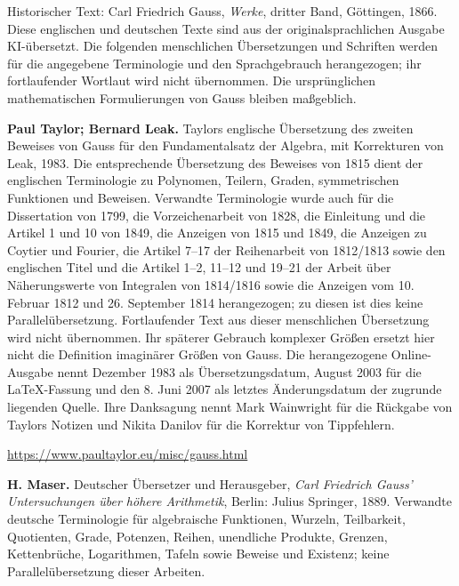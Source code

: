 \clearpage\thispagestyle{empty}\enlargethispage{3\baselineskip}\begingroup\small\raggedright
{}\medskip
Historischer Text: Carl Friedrich Gauss, \emph{Werke}, dritter Band, Göttingen, 1866. Diese englischen und deutschen Texte sind aus der originalsprachlichen Ausgabe KI-übersetzt. Die folgenden menschlichen Übersetzungen und Schriften werden für die angegebene Terminologie und den Sprachgebrauch herangezogen; ihr fortlaufender Wortlaut wird nicht übernommen. Die ursprünglichen mathematischen Formulierungen von Gauss bleiben maßgeblich.
\par\medskip\textbf{Paul Taylor; Bernard Leak.} Taylors englische Übersetzung des zweiten Beweises von Gauss für den Fundamentalsatz der Algebra, mit Korrekturen von Leak, 1983. Die entsprechende Übersetzung des Beweises von 1815 dient der englischen Terminologie zu Polynomen, Teilern, Graden, symmetrischen Funktionen und Beweisen. Verwandte Terminologie wurde auch für die Dissertation von 1799, die Vorzeichenarbeit von 1828, die Einleitung und die Artikel 1 und 10 von 1849, die Anzeigen von 1815 und 1849, die Anzeigen zu Coytier und Fourier, die Artikel 7–17 der Reihenarbeit von 1812/1813 sowie den englischen Titel und die Artikel 1–2, 11–12 und 19–21 der Arbeit über Näherungswerte von Integralen von 1814/1816 sowie die Anzeigen vom 10. Februar 1812 und 26. September 1814 herangezogen; zu diesen ist dies keine Parallelübersetzung. Fortlaufender Text aus dieser menschlichen Übersetzung wird nicht übernommen. Ihr späterer Gebrauch komplexer Größen ersetzt hier nicht die Definition imaginärer Größen von Gauss. Die herangezogene Online-Ausgabe nennt Dezember 1983 als Übersetzungsdatum, August 2003 für die LaTeX-Fassung und den 8. Juni 2007 als letztes Änderungsdatum der zugrunde liegenden Quelle. Ihre Danksagung nennt Mark Wainwright für die Rückgabe von Taylors Notizen und Nikita Danilov für die Korrektur von Tippfehlern.\par
\url{https://www.paultaylor.eu/misc/gauss.html}
\par\medskip\textbf{H. Maser.} Deutscher Übersetzer und Herausgeber, \emph{Carl Friedrich Gauss’ Untersuchungen über höhere Arithmetik}, Berlin: Julius Springer, 1889. Verwandte deutsche Terminologie für algebraische Funktionen, Wurzeln, Teilbarkeit, Quotienten, Grade, Potenzen, Reihen, unendliche Produkte, Grenzen, Kettenbrüche, Logarithmen, Tafeln sowie Beweise und Existenz; keine Parallelübersetzung dieser Arbeiten.\par
